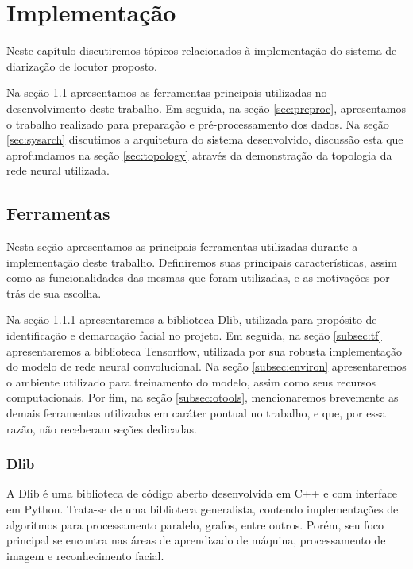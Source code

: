 \chapter{Implementação}
\label{chap:impl}

Neste capítulo discutiremos tópicos relacionados à implementação do sistema de diarização de locutor proposto. 

Na seção \ref{sec:tools} apresentamos as ferramentas principais utilizadas no desenvolvimento deste trabalho. Em seguida, na seção \ref{sec:preproc}, apresentamos o trabalho realizado para preparação e pré-processamento dos dados. Na seção \ref{sec:sysarch} discutimos a arquitetura do sistema desenvolvido, discussão esta que aprofundamos na seção \ref{sec:topology} através da demonstração da topologia da rede neural utilizada.

\section{Ferramentas}
\label{sec:tools}

Nesta seção apresentamos as principais ferramentas utilizadas durante a implementação deste trabalho. Definiremos suas principais características, assim como as funcionalidades das mesmas que foram utilizadas, e as motivações por trás de sua escolha.

Na seção \ref{subsec:dlib} apresentaremos a biblioteca Dlib, utilizada para propósito de identificação e demarcação facial no projeto. Em seguida, na seção \ref{subsec:tf} apresentaremos a biblioteca Tensorflow, utilizada por sua robusta implementação do modelo de rede neural convolucional. Na seção \ref{subsec:environ} apresentaremos o ambiente utilizado para treinamento do modelo, assim como seus recursos computacionais. Por fim, na seção \ref{subsec:otools}, mencionaremos brevemente as demais ferramentas utilizadas em caráter pontual no trabalho, e que, por essa razão, não receberam seções dedicadas.

\subsection{Dlib}
\label{subsec:dlib}
A Dlib\cite{dlib09} é uma biblioteca de código aberto desenvolvida em C++ e com interface em Python. Trata-se de uma biblioteca generalista, contendo implementações de algoritmos para processamento paralelo, grafos, entre outros. Porém, seu foco principal se encontra nas áreas de aprendizado de máquina, processamento de imagem e reconhecimento facial.

